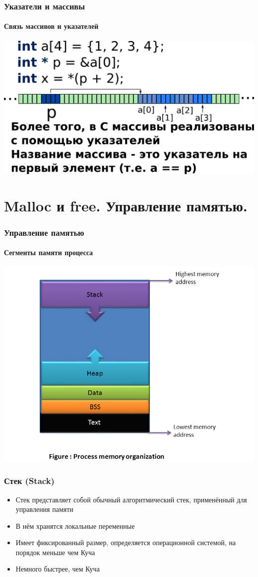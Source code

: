 \documentclass[12pt,pdf,hyperref={unicode}]{beamer}
\begin{document}
\begin{frame}[fragile]
\frametitle{Указатели и массивы} 
\framesubtitle{Связь массивов и указателей}
\begin{center}
\includegraphics[width=0.95\linewidth]{images/memory_parrays_5.png}
\end{center}
\end{frame}





\section{Malloc и free. Управление памятью.}

\begin{frame}[fragile]
\frametitle{Управление памятью} 
\framesubtitle{Сегменты памяти процесса}
\begin{center}
\includegraphics[width=0.8\linewidth]{images/process_memory_organization.png}
\end{center}
\end{frame}

\begin{frame}[fragile]
\frametitle{Стек (Stack)} 
\begin{itemize}
\item Стек представляет собой обычный алгоритмический стек, применённый для управления памяти
\item В нём хранятся локальные переменные
\item Имеет фиксированный размер, определяется операционной системой, на порядок меньше чем Куча
\item Немного быстрее, чем Куча
\end{itemize}
\end{frame}
\end{document}
